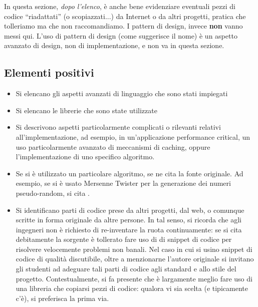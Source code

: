 %
In questa sezione, \textit{dopo l'elenco}, è anche bene evidenziare eventuali pezzi di codice ``riadattati'' (o scopiazzati...) da Internet o da altri progetti, pratica che tolleriamo ma che non raccomandiamo.
%
I pattern di design, invece \textbf{non} vanno messi qui.
%
L'uso di pattern di design (come suggerisce il nome) è un aspetto avanzato di design, non di implementazione,
e non va in questa sezione.

\subsection*{Elementi positivi}

\begin{itemize}
	\item Si elencano gli aspetti avanzati di linguaggio che sono stati impiegati
	\item Si elencano le librerie che sono state utilizzate
	\item Si descrivono aspetti particolarmente complicati o rilevanti relativi all'implementazione,
	ad esempio, in un'applicazione performance critical, un uso particolarmente avanzato di meccanismi
	di caching, oppure l'implementazione di uno specifico algoritmo.
	\item Se si è utilizzato un particolare algoritmo, se ne cita la fonte originale. Ad esempio, se
	si è usato Mersenne Twister per la generazione dei numeri pseudo-random, si cita \cite{mersenne}.
	\item Si identificano parti di codice prese da altri progetti, dal web, o comunque scritte in forma originale da altre persone. In tal senso, si ricorda che agli ingegneri non è richiesto di re-inventare la ruota continuamente: se si cita debitamente la sorgente è tollerato fare uso di di snippet di codice per risolvere velocemente problemi non banali. Nel caso in cui si usino snippet di codice di qualità discutibile, oltre a menzionarne l'autore originale si invitano gli studenti ad adeguare tali parti di codice agli standard e allo stile del progetto. Contestualmente, si fa presente che è largamente meglio fare uso di una libreria che copiarsi pezzi di codice: qualora vi sia scelta (e tipicamente c'è), si preferisca la prima via.
\end{itemize}

